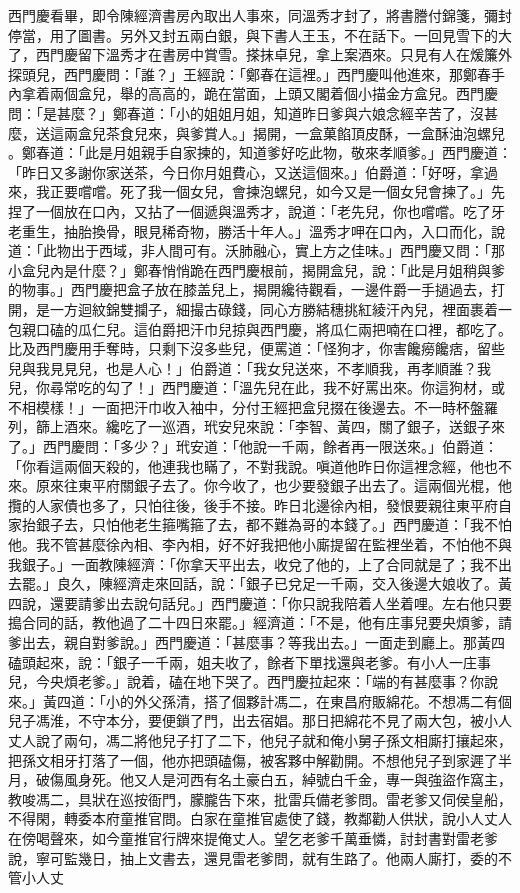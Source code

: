 \begin{showcontents}{}
西門慶看畢，即令陳經濟書房內取出人事來，同溫秀才封了，將書謄付錦箋，彌封停當，用了圖書。另外又封五兩白銀，與下書人王玉，不在話下。一回見雪下的大了，西門慶留下溫秀才在書房中賞雪。搽抹卓兒，拿上案酒來。只見有人在煖簾外探頭兒，西門慶問：「誰？」王經說：「鄭春在這裡。」西門慶叫他進來，那鄭春手內拿着兩個盒兒，舉的高高的，跪在當面，上頭又閣着個小描金方盒兒。西門慶問：「是甚麼？」鄭春道：「小的姐姐月姐，知道昨日爹與六娘念經辛苦了，沒甚麼，送這兩盒兒茶食兒來，與爹賞人。」揭開，一盒菓餡頂皮酥，一盒酥油泡螺兒 。鄭春道：「此是月姐親手自家揀的，知道爹好吃此物，敬來孝順爹。」西門慶道：「昨日又多謝你家送茶，今日你月姐費心，又送這個來。」伯爵道：「好呀，拿過來，我正要嚐嚐。死了我一個女兒，會揀泡螺兒，如今又是一個女兒會揀了。」先捏了一個放在口內，又拈了一個遞與溫秀才，說道：「老先兒，你也嚐嚐。吃了牙老重生，抽胎換骨，眼見稀奇物，勝活十年人。」溫秀才呷在口內，入口而化，說道：「此物出于西域，非人間可有。沃肺融心，實上方之佳味。」西門慶又問：「那小盒兒內是什麼？」鄭春悄悄跪在西門慶根前，揭開盒兒，說：「此是月姐稍與爹的物事。」西門慶把盒子放在膝盖兒上，揭開纔待觀看，一邊件爵一手撾過去，打開，是一方迴紋錦雙攔子，細撮古碌錢，同心方勝結穗挑紅綾汗內兒，裡面裹着一包親口磕的瓜仁兒。這伯爵把汗巾兒掠與西門慶，將瓜仁兩把喃在口裡，都吃了。比及西門慶用手奪時，只剩下沒多些兒，便罵道：「怪狗才，你害饞癆饞痞，留些兒與我見見兒，也是人心！」伯爵道：「我女兒送來，不孝順我，再孝順誰？我兒，你尋常吃的勾了！」西門慶道：「溫先兒在此，我不好罵出來。你這狗材，或不相模樣！」一面把汗巾收入袖中，分付王經把盒兒掇在後邊去。不一時杯盤羅列，篩上酒來。纔吃了一巡酒，玳安兒來說：「李智、黃四，關了銀子，送銀子來了。」西門慶問：「多少？」玳安道：「他說一千兩，餘者再一限送來。」伯爵道：「你看這兩個天殺的，他連我也瞞了，不對我說。嗔道他昨日你這裡念經，他也不來。原來往東平府關銀子去了。你今收了，也少要發銀子出去了。這兩個光棍，他攬的人家債也多了，只怕往後，後手不接。昨日北邊徐內相，發恨要親往東平府自家抬銀子去，只怕他老生箍嘴箍了去，都不難為哥的本錢了。」西門慶道：「我不怕他。我不管甚麼徐內相、李內相，好不好我把他小廝提留在監裡坐着，不怕他不與我銀子。」一面教陳經濟：「你拿天平出去，收兌了他的，上了合同就是了；我不出去罷。」良久，陳經濟走來回話，說：「銀子已兌足一千兩，交入後邊大娘收了。黃四說，還要請爹出去說句話兒。」西門慶道：「你只說我陪着人坐着哩。左右他只要搗合同的話，教他過了二十四日來罷。」經濟道：「不是，他有庄事兒要央煩爹，請爹出去，親自對爹說。」西門慶道：「甚麼事？等我出去。」一面走到廳上。那黃四磕頭起來，說：「銀子一千兩，姐夫收了，餘者下單找還與老爹。有小人一庄事兒，今央煩老爹。」說着，磕在地下哭了。西門慶拉起來：「端的有甚麼事？你說來。」黃四道：「小的外父孫清，搭了個夥計馮二，在東昌府販綿花。不想馮二有個兒子馮淮，不守本分，要便鎖了門，出去宿娼。那日把綿花不見了兩大包，被小人丈人說了兩句，馮二將他兒子打了二下，他兒子就和俺小舅子孫文相廝打攘起來，把孫文相牙打落了一個，他亦把頭磕傷，被客夥中解勸開。不想他兒子到家遲了半月，破傷風身死。他又人是河西有名土豪白五，綽號白千金，專一與強盜作窩主，教唆馮二，具狀在巡按衙門，朦朧告下來，批雷兵備老爹問。雷老爹又伺侯皇船，不得閑，轉委本府童推官問。白家在童推官處使了錢，教鄰勸人供狀，說小人丈人在傍喝聲來，如今童推官行牌來提俺丈人。望乞老爹千萬垂憐，討封書對雷老爹說，寧可監幾日，抽上文書去，還見雷老爹問，就有生路了。他兩人廝打，委的不管小人丈
\end{showcontents}
